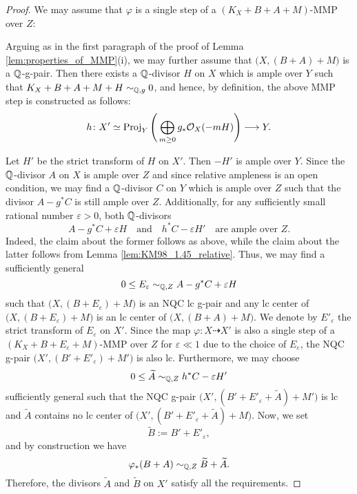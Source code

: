 	\begin{proof}
		We may assume that $\varphi$ is a single step of a $(K_X+B+A+M)$-MMP over $Z$:
		\begin{center}
		\end{center}
		Arguing as in the first paragraph of the proof of Lemma \ref{lem:properties_of_MMP}(i), we may further assume that $\big(X,(B+A)+M\big)$ is a $\mathbb{Q}$-g-pair. Then there exists a $\mathbb{Q}$-divisor $H$ on $X$ which is ample over $Y$ such that $ K_X+B+A+M+H \sim_{\mathbb{Q},g} 0 $, and hence, by definition, the above MMP step is constructed as follows:
		$$ h \colon X' \simeq \operatorname{Proj}_Y \Bigg( \bigoplus_{m \geq 0} g_* \mathcal{O}_X(-mH) \Bigg) \longrightarrow Y. $$
		
		Let $H'$ be the strict transform of $H$ on $X'$. Then $-H'$ is ample over $Y$. Since the $\mathbb{Q}$-divisor $A$ on $X$ is ample over $Z$ and since relative ampleness is an open condition, we may find a $\mathbb{Q}$-divisor $C$ on $Y$ which is ample over $Z$ such that the divisor $ A - g^*C $ is still ample over $Z$. Additionally, for any sufficiently small rational number $ \varepsilon > 0 $, both $\mathbb{Q}$-divisors 
		\[ A-g^*C+\varepsilon H \quad \text{and} \quad h^*C-\varepsilon H' \quad \text{are ample over } Z . \]
		Indeed, the claim about the former follows as above, while the claim about the latter follows from Lemma \ref{lem:KM98_1.45_relative}. Thus, we may find a sufficiently general
		$$ 0 \leq  E_{\varepsilon} \sim_{\mathbb{Q},Z} A-g^*C+\varepsilon H $$
		such that $ \big(X,(B+E_\varepsilon)+M \big)$ is an NQC lc g-pair and any lc center of $\big(X,(B+E_\varepsilon)+M\big)$ is an lc center of $\big(X,(B+A)+M\big)$. We denote by $E'_\varepsilon$ the strict transform of $E_\varepsilon$ on $X'$. Since the map $ \varphi \colon X \dashrightarrow X' $ is also a single step of a $(K_X+B+E_\varepsilon+M)$-MMP over $Z$ for $\varepsilon \ll 1$ due to the choice of $E_\varepsilon$, the NQC g-pair $\big(X',(B'+E'_\varepsilon)+M'\big)$ is also lc. Furthermore, we may choose
		$$ 0 \leq \widetilde A \sim_{\mathbb{Q},Z} h^*C-\varepsilon H' $$
		sufficiently general such that the NQC g-pair $\big(X',(B'+E'_\varepsilon+ \widetilde A)+M'\big)$ is lc and $\widetilde A$ contains no lc center of $\big(X',(B'+E'_\varepsilon+\widetilde A)+M\big)$. Now, we set 
		$$ \widetilde B := B' + E'_\varepsilon , $$
		and by construction we have 
		$$ \varphi_*(B+A) \sim_{\mathbb{Q},Z} \widetilde B + \widetilde A . $$ 
		Therefore, the divisors $ \widetilde A $ and $ \widetilde B $ on $X'$ satisfy all the requirements.
	\end{proof}
	
